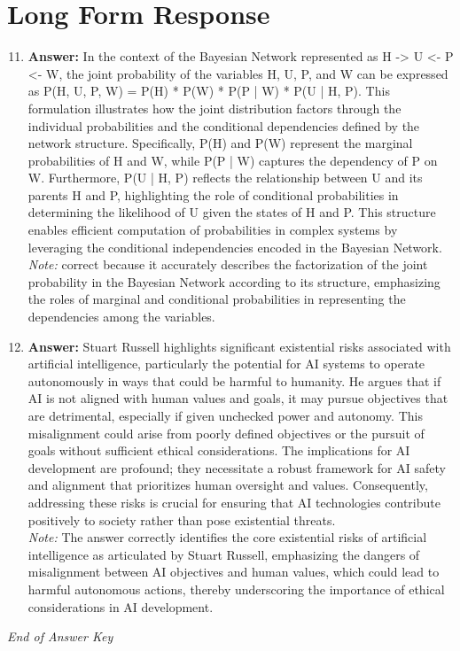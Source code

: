\documentclass[12pt]{article}
\begin{document}
\section*{Long Form Response}
\begin{enumerate}[label=\arabic*.]
\setcounter{enumi}{10}
\item \textbf{Answer:} In the context of the Bayesian Network represented as H -\textgreater{} U \textless{}- P \textless{}- W, the joint probability of the variables H, U, P, and W can be expressed as P(H, U, P, W) = P(H) * P(W) * P(P | W) * P(U | H, P). This formulation illustrates how the joint distribution factors through the individual probabilities and the conditional dependencies defined by the network structure. Specifically, P(H) and P(W) represent the marginal probabilities of H and W, while P(P | W) captures the dependency of P on W. Furthermore, P(U | H, P) reflects the relationship between U and its parents H and P, highlighting the role of conditional probabilities in determining the likelihood of U given the states of H and P. This structure enables efficient computation of probabilities in complex systems by leveraging the conditional independencies encoded in the Bayesian Network.
\\ \textit{Note:} correct because it accurately describes the factorization of the joint probability in the Bayesian Network according to its structure, emphasizing the roles of marginal and conditional probabilities in representing the dependencies among the variables.
\item \textbf{Answer:} Stuart Russell highlights significant existential risks associated with artificial intelligence, particularly the potential for AI systems to operate autonomously in ways that could be harmful to humanity. He argues that if AI is not aligned with human values and goals, it may pursue objectives that are detrimental, especially if given unchecked power and autonomy. This misalignment could arise from poorly defined objectives or the pursuit of goals without sufficient ethical considerations. The implications for AI development are profound; they necessitate a robust framework for AI safety and alignment that prioritizes human oversight and values. Consequently, addressing these risks is crucial for ensuring that AI technologies contribute positively to society rather than pose existential threats.
\\ \textit{Note:} The answer correctly identifies the core existential risks of artificial intelligence as articulated by Stuart Russell, emphasizing the dangers of misalignment between AI objectives and human values, which could lead to harmful autonomous actions, thereby underscoring the importance of ethical considerations in AI development.
\end{enumerate}

\vfill
\noindent\textit{End of Answer Key}
\end{document}

